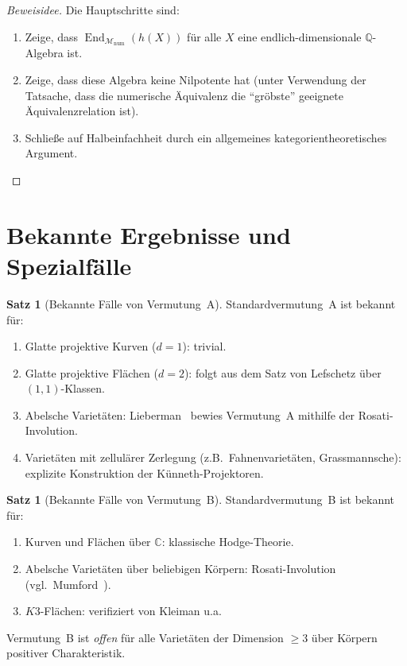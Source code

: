 \documentclass[12pt,a4paper]{amsart}
\theoremstyle{definition}
\newtheorem{satz}[theorem]{Satz}
\newcommand{\Q}{\mathbb{Q}}
\newcommand{\C}{\mathbb{C}}
\DeclareMathOperator{\End}{End}
\begin{document}
\begin{proof}[Beweisidee]
Die Hauptschritte sind:
\begin{enumerate}[label=(\arabic*)]
  \item Zeige, dass $\End_{\mathcal{M}_{\mathrm{num}}}(h(X))$ für alle $X$
        eine endlich-dimensionale $\Q$-Algebra ist.
  \item Zeige, dass diese Algebra keine Nilpotente hat (unter Verwendung der
        Tatsache, dass die numerische Äquivalenz die ``gröbste'' geeignete
        Äquivalenzrelation ist).
  \item Schließe auf Halbeinfachheit durch ein allgemeines kategorientheoretisches
        Argument.
\end{enumerate}
\end{proof}

\section{Bekannte Ergebnisse und Spezialfälle}\label{sec:bekannt}

\begin{satz}[Bekannte Fälle von Vermutung~A]
Standardvermutung~A ist bekannt für:
\begin{enumerate}[label=(\roman*)]
  \item Glatte projektive Kurven ($d=1$): trivial.
  \item Glatte projektive Flächen ($d=2$): folgt aus dem Satz von Lefschetz
        über $(1,1)$-Klassen.
  \item Abelsche Varietäten: Lieberman~\cite{lieberman1968} bewies Vermutung~A
        mithilfe der Rosati-Involution.
  \item Varietäten mit zellulärer Zerlegung (z.B.\ Fahnenvarietäten,
        Grassmannsche): explizite Konstruktion der Künneth-Projektoren.
\end{enumerate}
\end{satz}

\begin{satz}[Bekannte Fälle von Vermutung~B]
Standardvermutung~B ist bekannt für:
\begin{enumerate}[label=(\roman*)]
  \item Kurven und Flächen über $\C$: klassische Hodge-Theorie.
  \item Abelsche Varietäten über beliebigen Körpern: Rosati-Involution
        (vgl.\ Mumford~\cite{mumford1970}).
  \item $K3$-Flächen: verifiziert von Kleiman u.a.
\end{enumerate}
Vermutung~B ist \emph{offen} für alle Varietäten der Dimension $\geq 3$
über Körpern positiver Charakteristik.
\end{satz}
\end{document}
